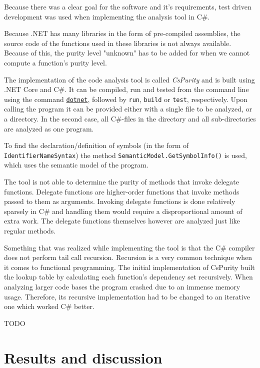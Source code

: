 \documentclass[a4paper,12pt]{article}
\begin{document}

Because there was a clear goal for the software and it's requirements, test driven development was used when implementing the analysis tool in C\#.

Because .NET has many libraries in the form of pre-compiled assemblies, the source code of the functions used in these libraries is not always available. Because of this, the purity level "unknown" has to be added for when we cannot compute a function's purity level.

The implementation of the code analysis tool is called \textit{CsPurity} and is built using .NET Core and C\#. It can be compiled, run and tested from the command line using the command \href{https://docs.microsoft.com/en-us/dotnet/core/tools/}{\texttt{dotnet}}, followed by \texttt{run}, \texttt{build} or \texttt{test}, respectively. Upon calling the program it can be provided either with a single file to be analyzed, or a directory. In the second case, all C\#-files in the directory and all sub-directories are analyzed as one program.

To find the declaration/definition of symbols (in the form of \texttt{IdentifierNameSyn\allowbreak tax}) the method \texttt{SemanticModel.GetSym\allowbreak bolInfo()} is used, which uses the semantic model of the program.

The tool is not able to determine the purity of methods that invoke delegate functions. Delegate functions are higher-order functions that invoke methods passed to them as arguments. Invoking delegate functions is done relatively sparsely in C\# and handling them would require a disproportional amount of extra work. The delegate functions themselves however are analyzed just like regular methods.

Something that was realized while implementing the tool is that the C\# compiler does not perform tail call recursion. Recursion is a very common technique when it comes to functional programming. The initial implementation of CsPurity built the lookup table by calculating each function's dependency set recursively. When analyzing larger code bases the program crashed due to an immense memory usage. Therefore, its recursive implementation had to be changed to an iterative one which worked C\# better.

TODO

\section{Results and discussion} \label{sec:results-and-discussion}
\end{document}
